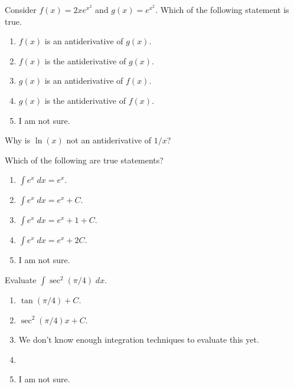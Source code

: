 \documentclass[14pt]{beamer}
\begin{document}
\begin{frame}[t]
  Consider \(f(x) = 2x e^{x^{2}}\) and \(g(x) = e^{x^{2}}\). Which of the following statement is true.

  \medskip
  \begin{enumerate} \setlength\itemsep{1ex}
    \item \(f(x)\) is an antiderivative of \(g(x)\).
    \item \(f(x)\) is the antiderivative of \(g(x)\).
    \item \(g(x)\) is an antiderivative of \(f(x)\).
    \item \(g(x)\) is the antiderivative of \(f(x)\).
    \item I am not sure.
  \end{enumerate} 
\end{frame}

\begin{frame}
  Why is \(\ln(x)\) not an antiderivative of \(1/x\)?
\end{frame}

\begin{frame}[t]
  Which of the following are true statements?

  \medskip
  \begin{enumerate} \setlength\itemsep{1ex}
    \item \(\int e^{x} \;dx = e^{x}\).
    \item \(\int e^{x} \;dx = e^{x} + C\).
    \item \(\int e^{x} \;dx = e^{x} + 1 + C\).
    \item \(\int e^{x} \;dx = e^{x} + 2C\).
    \item I am not sure.
  \end{enumerate} 
\end{frame}

\begin{frame}[t]
  Evaluate \(\int \sec^{2}(\pi/4) \;dx\).

  \begin{enumerate} \setlength\itemsep{1ex}
    \item \(\tan(\pi/4) + C\).
    \item \(\sec^{2}(\pi/4)x + C\).
    \item We don't know enough integration techniques to evaluate this yet. 
    \item 
    \item I am not sure.
  \end{enumerate} 
\end{frame}
\end{document}

